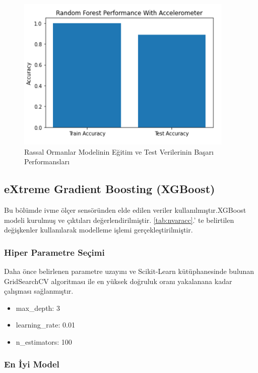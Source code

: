 \documentclass[12pt,twoside]{deuthesis}
\providecommand{\tightlist}{%
  \setlength{\itemsep}{0pt}\setlength{\parskip}{0pt}}
\begin{document}
\begin{figure}

{\centering \includegraphics[width=0.6\linewidth,height=0.25\textheight]{figure/irandom_forest_testtrain} 

}

\caption{Rassal Ormanlar Modelinin Eğitim ve Test Verilerinin Başarı Performansları}\label{fig:irandomforesttesttrain}
\end{figure}
\hypertarget{extreme-gradient-boosting-xgboost-1}{%
\subsection{eXtreme Gradient Boosting (XGBoost)}\label{extreme-gradient-boosting-xgboost-1}}

Bu bölümde ivme ölçer sensöründen elde edilen veriler kullanılmıştır.XGBoost modeli kurulmuş ve çıktıları değerlendirilmiştir.
\ref{tab:nvaracc}.' te belirtilen değişkenler kullanılarak modelleme işlemi gerçekleştirilmiştir.

\hypertarget{hiper-parametre-seuxe7imi-6}{%
\subsubsection{Hiper Parametre Seçimi}\label{hiper-parametre-seuxe7imi-6}}

Daha önce belirlenen parametre uzayını ve Scikit-Learn kütüphanesinde bulunan GridSearchCV algoritması ile en yüksek doğruluk oranı yakalanana kadar çalışması sağlanmıştır.
\begin{itemize}
\tightlist
\item
  max\_depth: 3
\item
  learning\_rate: 0.01
\item
  n\_estimators: 100
\end{itemize}
\hypertarget{en-iyi-model-7}{%
\subsubsection{En İyi Model}\label{en-iyi-model-7}}
\end{document}
